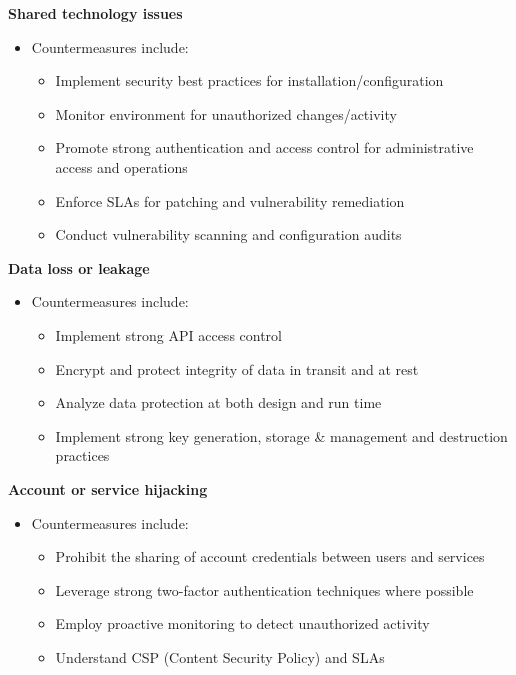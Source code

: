 \textbf{Shared technology issues}
\begin{itemize}
    \item Countermeasures include:
    \begin{itemize}
        \item Implement security best practices for installation/configuration
        \item Monitor environment for unauthorized changes/activity
        \item Promote strong authentication and access control for administrative access and operations
        \item Enforce SLAs for patching and vulnerability remediation
        \item Conduct vulnerability scanning and configuration audits\\
    \end{itemize}
\end{itemize}

\textbf{Data loss or leakage}
\begin{itemize}
    \item Countermeasures include:
    \begin{itemize}
        \item Implement strong API access control
        \item Encrypt and protect integrity of data in transit and at rest
        \item Analyze data protection at both design and run time
        \item Implement strong key generation, storage \& management and destruction practices\\
    \end{itemize}
\end{itemize}

\textbf{Account or service hijacking}
\begin{itemize}
    \item Countermeasures include:
    \begin{itemize}
        \item Prohibit the sharing of account credentials between users and services
        \item Leverage strong two-factor authentication techniques where possible
        \item Employ proactive monitoring to detect unauthorized activity
        \item Understand CSP (Content Security Policy) and SLAs\\
    \end{itemize}
\end{itemize}

